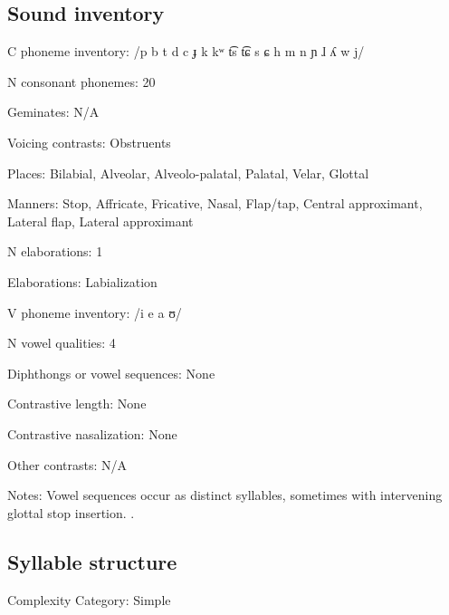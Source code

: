 {\subsection*{Sound inventory}
\begin{appendixdesc}

\item[C phoneme inventory:] /p b t d c ɟ k kʷ t͡s t͡ɕ s ɕ h m n ɲ ɺ ʎ w j/

\item[N consonant phonemes:] 20

\item[Geminates:] N/A

\item[Voicing contrasts:] Obstruents

\item[Places:] Bilabial, Alveolar, Alveolo-palatal, Palatal, Velar, Glottal

\item[Manners:] Stop, Affricate, Fricative, Nasal, Flap/tap, Central approximant, Lateral flap, Lateral approximant

\item[N elaborations:] 1

\item[Elaborations:] Labialization

\item[V phoneme inventory:] /i e a ʊ/

\item[N vowel qualities:] 4

\item[Diphthongs or vowel sequences:] None

\item[Contrastive length:] None

\item[Contrastive nasalization:] None

\item[Other contrasts:] N/A

\item[Notes:] Vowel sequences occur as distinct syllables, sometimes with intervening glottal stop insertion. \citep[28--29]{Guillaume2008}.
\end{appendixdesc}
\subsection*{Syllable structure}
\begin{appendixdesc}

\item[Complexity Category:] Simple


\end{appendixdesc}}
